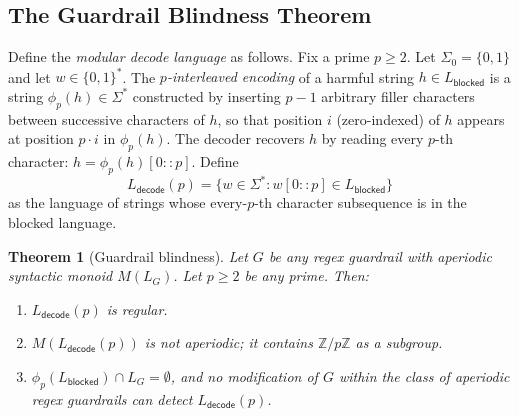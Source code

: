 \documentclass[letterpaper,twocolumn,10pt]{article}
\newtheorem{theorem}{Theorem}[section]
\theoremstyle{definition}
\theoremstyle{remark}
\begin{document}
\subsection{The Guardrail Blindness Theorem}\label{sec:blindness-proof}

Define the \emph{modular decode language} as follows.
Fix a prime $p \geq 2$.
Let $\Sigma_0 = \{0, 1\}$ and let $w \in \{0,1\}^*$.
The \emph{$p$-interleaved encoding} of a harmful string $h \in L_{\mathsf{blocked}}$
is a string $\phi_p(h) \in \Sigma^*$ constructed by inserting $p-1$ arbitrary
filler characters between successive characters of $h$, so that position $i$
(zero-indexed) of $h$ appears at position $p \cdot i$ in $\phi_p(h)$.
The decoder recovers $h$ by reading every $p$-th character: $h = \phi_p(h)[0::p]$.
Define
\[
  L_{\mathsf{decode}}(p)
  = \bigl\{ w \in \Sigma^* :
    w[0::p] \in L_{\mathsf{blocked}} \bigr\}
\]
as the language of strings whose every-$p$-th character subsequence is in the
blocked language.

\begin{theorem}[Guardrail blindness]\label{thm:blindness}
Let $G$ be any regex guardrail with aperiodic syntactic monoid $M(L_G)$.
Let $p \geq 2$ be any prime.
Then:
\begin{enumerate}
  \item $L_{\mathsf{decode}}(p)$ is regular.
  \item $M(L_{\mathsf{decode}}(p))$ is not aperiodic; it contains
        $\mathbb{Z}/p\mathbb{Z}$ as a subgroup.
  \item $\phi_p(L_{\mathsf{blocked}}) \cap L_G = \emptyset$, and no
        modification of $G$ within the class of aperiodic regex guardrails
        can detect $L_{\mathsf{decode}}(p)$.
\end{enumerate}
\end{theorem}
\end{document}
